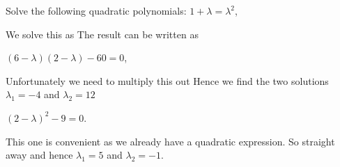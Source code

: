 
\label{exBeesQuadratics}
Solve the following quadratic polynomials:
\subquestion $1+\lambda=\lambda^2$,

\solution 
We solve this as 
The result can be written as 

\subquestion $(6-\lambda)(2-\lambda)-60=0$,

\solution 
Unfortunately we need to multiply this out
Hence we find the two solutions $\lambda_1 = -4$ and $\lambda_2=12$

\subquestion $(2-\lambda)^2-9=0$.

\solution 
This one is convenient as we already have a quadratic expression. So straight away 
and hence $\lambda_1=5$ and $\lambda_2=-1$.

\solutionend